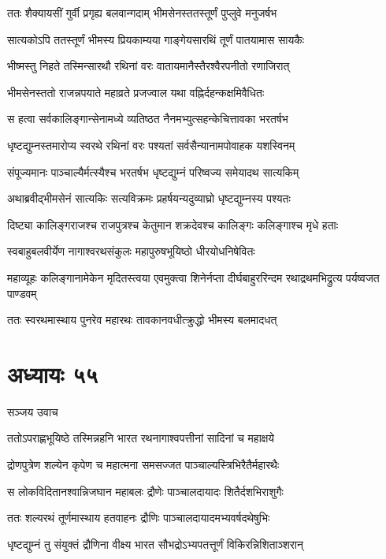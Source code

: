 \twolineshloka
{ततः शैक्यायसीं गुर्वी प्रगृह्य बलवान्गदाम्}
{भीमसेनस्ततस्तूर्णं पुप्लुवे मनुजर्षभ}


\twolineshloka
{सात्यकोऽपि ततस्तूर्णं भीमस्य प्रियकाम्यया}
{गाङ्गेयसारथिं तूर्णं पातयामास सायकैः}


\twolineshloka
{भीष्मस्तु निहते तस्मिन्सारथौ रथिनां वरः}
{वातायमानैस्तैरश्वैरपनीतो रणाजिरात्}


\twolineshloka
{भीमसेनस्ततो राजन्नपयाते महाव्रते}
{प्रजज्वाल यथा वह्निर्दहन्कक्षमिवैधितः}


\twolineshloka
{स हत्वा सर्वकालिङ्गान्सेनामध्ये व्यतिष्ठत}
{नैनमभ्युत्सहन्केचित्तावका भरतर्षभ}


\twolineshloka
{धृष्टद्युम्नस्तमारोप्य स्वरथे रथिनां वरः}
{पश्यतां सर्वसैन्यानामपोवाहक यशस्विनम्}


\twolineshloka
{संपूज्यमानः पाञ्चाल्यैर्मत्स्यैश्च भरतर्षभ}
{धृष्टद्युम्नं परिष्वज्य समेयादथ सात्यकिम्}


\twolineshloka
{अथाब्रवीद्भीमसेनं सात्यकिः सत्यविक्रमः}
{प्रहर्षयन्यदुव्याघ्रो धृष्टद्युम्नस्य पश्यतः}


\twolineshloka
{दिष्ट्या कालिङ्गराजश्च राजपुत्रश्च केतुमान}
{शक्रदेवश्च कालिङ्गः कलिङ्गाश्च मृधे हताः}


\twolineshloka
{स्वबाहुबलवीर्येण नागाश्वरथसंकुलः}
{महापुरुषभूयिष्ठो धीरयोधनिषेवितः}


\threelineshloka
{महाव्यूहः कलिङ्गानामेकेन मृदितस्त्वया}
{एवमुक्त्वा शिनेर्नप्ता दीर्घबाहुररिन्दम}
{रथाद्रथमभिद्रुत्य पर्यष्वजत पाण्डवम्}


\twolineshloka
{ततः स्वरथमास्थाय पुनरेव महारथः}
{तावकानवधीत्क्रुद्धो भीमस्य बलमादधत्}


\chapter{अध्यायः ५५}
\twolineshloka
{सञ्जय उवाच}
{}


\twolineshloka
{ततोऽपराह्णभूयिष्ठे तस्मिन्नहनि भारत}
{रथनागाश्वपत्तीनां सादिनां च महाक्षये}


\twolineshloka
{द्रोणपुत्रेण शल्येन कृपेण च महात्मना}
{समसज्जत पाञ्चाल्यस्त्रिभिरैतैर्महारथैः}


\twolineshloka
{स लोकविदितानश्वान्निजघान महाबलः}
{द्रौणेः पाञ्चालदायादः शितैर्दशभिराशुगैः}


\twolineshloka
{ततः शल्यरथं तूर्णमास्थाय हतवाहनः}
{द्रौणिः पाञ्चालदायादमभ्यवर्षदथेषुभिः}


\twolineshloka
{धृष्टद्युम्नं तु संयुक्तं द्रौणिना वीक्ष्य भारत}
{सौभद्रोऽभ्यपतत्तूर्णं विकिरन्निशिताञ्शरान्}


